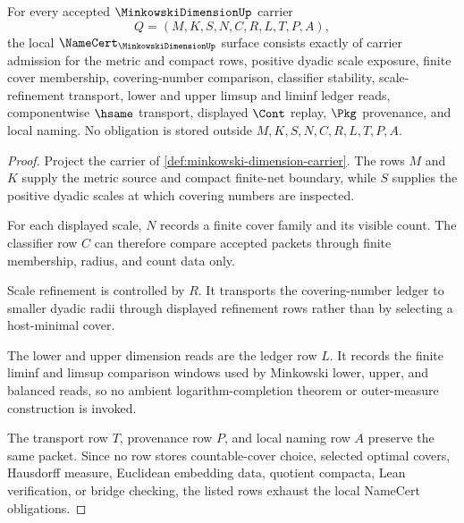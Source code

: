 \begin{theorem}
\label{thm:minkowski-dimension-namecert-obligations}
For every accepted $\MinkowskiDimensionUp$ carrier
$$
Q=(M,K,S,N,C,R,L,T,P,A),
$$
the local $\NameCert_{\MinkowskiDimensionUp}$ surface consists exactly of carrier admission for the metric and compact rows, positive dyadic scale exposure, finite cover membership, covering-number comparison, classifier stability, scale-refinement transport, lower and upper limsup and liminf ledger reads, componentwise $\hsame$ transport, displayed $\Cont$ replay, $\Pkg$ provenance, and local naming. No obligation is stored outside $M,K,S,N,C,R,L,T,P,A$.
\end{theorem}
\begin{proof}
Project the carrier of \autoref{def:minkowski-dimension-carrier}. The rows $M$ and $K$ supply the metric source and compact finite-net boundary, while $S$ supplies the positive dyadic scales at which covering numbers are inspected.

For each displayed scale, $N$ records a finite cover family and its visible count. The classifier row $C$ can therefore compare accepted packets through finite membership, radius, and count data only.

Scale refinement is controlled by $R$. It transports the covering-number ledger to smaller dyadic radii through displayed refinement rows rather than by selecting a host-minimal cover.

The lower and upper dimension reads are the ledger row $L$. It records the finite liminf and limsup comparison windows used by Minkowski lower, upper, and balanced reads, so no ambient logarithm-completion theorem or outer-measure construction is invoked.

The transport row $T$, provenance row $P$, and local naming row $A$ preserve the same packet. Since no row stores countable-cover choice, selected optimal covers, Hausdorff measure, Euclidean embedding data, quotient compacta, Lean verification, or bridge checking, the listed rows exhaust the local NameCert obligations.
\end{proof}

